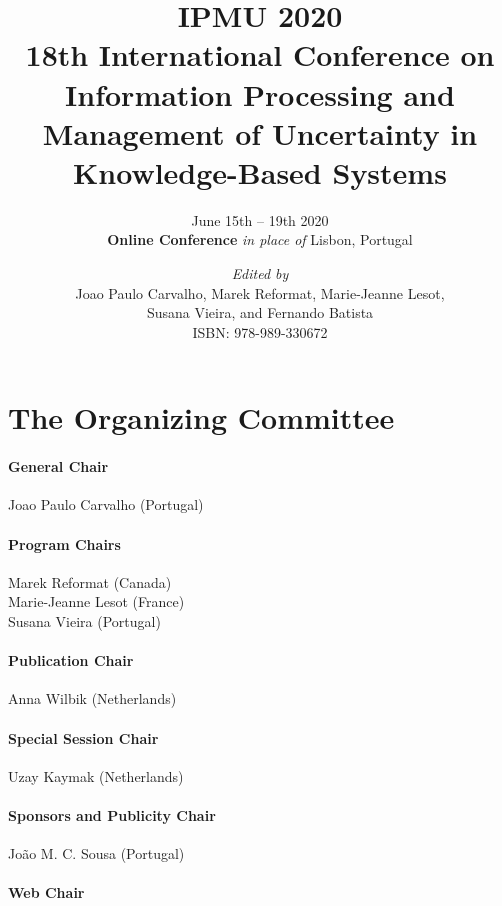 \documentclass[11pt, twoside, b5paper]{extbook}
\title{\sffamily \textbf{IPMU 2020} \\[1ex]
18th International Conference on Information Processing and Management of Uncertainty in Knowledge-Based Systems}
\author{June 15th – 19th 2020\\[1ex]
{\bf Online Conference} {\em in place of} Lisbon, Portugal}
\date{
{\em Edited by}\\
\vspace{1em}
Joao Paulo Carvalho,
Marek Reformat, 
Marie-Jeanne Lesot,\\
Susana Vieira,
and Fernando Batista\\
\vspace{1em}
ISBN: 978-989-330672
}
\begin{document}


\clearpage

\frontmatter
\maketitle


\begin{small}
\tableofcontents
\end{small}

\chapter*{The Organizing Committee}

\subsubsection*{General Chair}

Joao Paulo Carvalho (Portugal)

\subsubsection*{Program Chairs}

Marek Reformat (Canada)\\
Marie-Jeanne Lesot (France)\\
Susana Vieira (Portugal)

\subsubsection*{Publication Chair}

Anna Wilbik (Netherlands)

\subsubsection*{Special Session Chair}

Uzay Kaymak (Netherlands)

\subsubsection*{Sponsors and Publicity Chair}

João M. C. Sousa (Portugal)

\subsubsection*{Web Chair}
\end{document}
